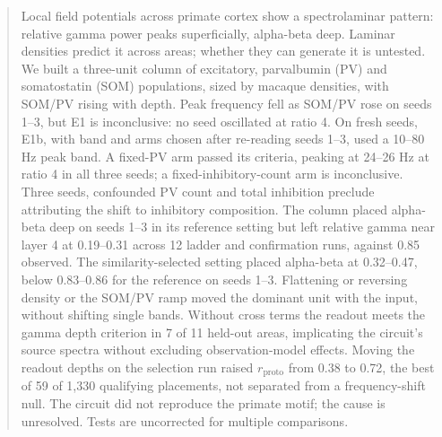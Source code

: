 \begin{abstract}
Local field potentials across primate cortex show a spectrolaminar pattern: relative gamma power peaks superficially, alpha-beta deep. Laminar densities predict it across areas; whether they can generate it is untested. We built a three-unit column of excitatory, parvalbumin (PV) and somatostatin (SOM) populations, sized by macaque densities, with SOM/PV rising with depth. Peak frequency fell as SOM/PV rose on seeds 1--3, but E1 is inconclusive: no seed oscillated at ratio 4. On fresh seeds, E1b, with band and arms chosen after re-reading seeds 1--3, used a 10--80 Hz peak band. A fixed-PV arm passed its criteria, peaking at 24--26 Hz at ratio 4 in all three seeds; a fixed-inhibitory-count arm is inconclusive. Three seeds, confounded PV count and total inhibition preclude attributing the shift to inhibitory composition. The column placed alpha-beta deep on seeds 1--3 in its reference setting but left relative gamma near layer 4 at 0.19--0.31 across 12 ladder and confirmation runs, against 0.85 observed. The similarity-selected setting placed alpha-beta at 0.32--0.47, below 0.83--0.86 for the reference on seeds 1--3. Flattening or reversing density or the SOM/PV ramp moved the dominant unit with the input, without shifting single bands. Without cross terms the readout meets the gamma depth criterion in 7 of 11 held-out areas, implicating the circuit's source spectra without excluding observation-model effects. Moving the readout depths on the selection run raised $r_\text{proto}$ from 0.38 to 0.72, the best of 59 of 1,330 qualifying placements, not separated from a frequency-shift null. The circuit did not reproduce the primate motif; the cause is unresolved. Tests are uncorrected for multiple comparisons.
\end{abstract}
